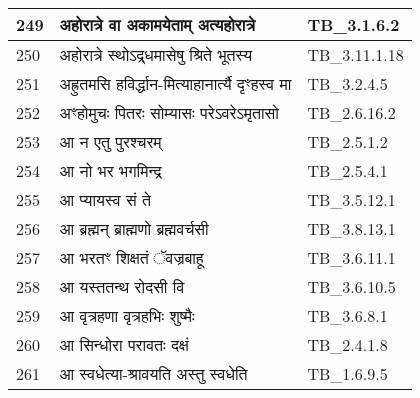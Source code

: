 \documentclass[17pt]{extarticle}
\begin{document}
\begin{longtable}{||p{0.4in}||p{4.9in}||p{0.9in}||}
    \hline
        
    249 & अहोरात्रे वा अकामयेताम् अत्यहोरात्रे & TB\_3.1.6.2       \\
    
    \hline
        
    250 & अहोरात्रे स्थोऽद्र्धमासेषु श्रिते भूतस्य & TB\_3.11.1.18       \\
    
    \hline
        
    251 & अह्रुतमसि हविर्द्धान{-}मित्याहानार्त्यै दृꣳहस्व मा & TB\_3.2.4.5       \\
    
    \hline
        
    252 & अꣳहोमुचः पितरः सोम्यासः परेऽवरेऽमृतासो & TB\_2.6.16.2       \\
    
    \hline
        
    253 & आ न एतु पुरश्चरम् & TB\_2.5.1.2       \\
    
    \hline
        
    254 & आ नो भर भगमिन्द्र & TB\_2.5.4.1       \\
    
    \hline
        
    255 & आ प्यायस्व सं ते & TB\_3.5.12.1       \\
    
    \hline
        
    256 & आ ब्रह्मन् ब्राह्मणो ब्रह्मवर्चसी & TB\_3.8.13.1       \\
    
    \hline
        
    257 & आ भरतꣳ शिक्षतं ॅवज्रबाहू & TB\_3.6.11.1       \\
    
    \hline
        
    258 & आ यस्ततन्थ रोदसी वि & TB\_3.6.10.5       \\
    
    \hline
        
    259 & आ वृत्रहणा वृत्रहभिः शुष्मैः & TB\_3.6.8.1       \\
    
    \hline
        
    260 & आ सिन्धोरा परावतः दक्षं & TB\_2.4.1.8       \\
    
    \hline
        
    261 & आ स्वधेत्या{-}श्रावयति अस्तु स्वधेति & TB\_1.6.9.5       \\
    

\end{longtable}
\end{document}
